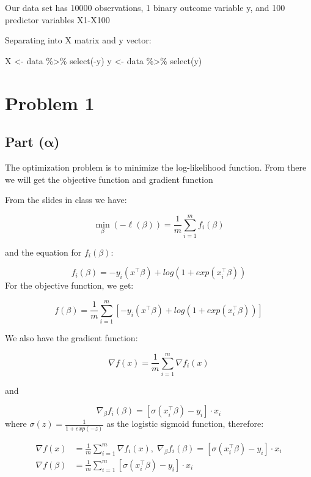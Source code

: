 \documentclass[
  letterpaper,
  DIV=11,
  numbers=noendperiod]{scrartcl}
\newenvironment{Shaded}{\begin{snugshade}}{\end{snugshade}}
\newcommand{\FunctionTok}[1]{\textcolor[rgb]{0.28,0.35,0.67}{#1}}
\newcommand{\NormalTok}[1]{\textcolor[rgb]{0.00,0.23,0.31}{#1}}
\newcommand{\OtherTok}[1]{\textcolor[rgb]{0.00,0.23,0.31}{#1}}
\newcommand{\SpecialCharTok}[1]{\textcolor[rgb]{0.37,0.37,0.37}{#1}}
\begin{document}
Our data set has 10000 observations, 1 binary outcome variable y, and
100 predictor variables X1-X100

Separating into X matrix and y vector:

\begin{Shaded}
\begin{Highlighting}[]
\NormalTok{X }\OtherTok{\textless{}{-}}\NormalTok{ data }\SpecialCharTok{\%\textgreater{}\%}
  \FunctionTok{select}\NormalTok{(}\SpecialCharTok{{-}}\NormalTok{y)}
\NormalTok{y }\OtherTok{\textless{}{-}}\NormalTok{ data }\SpecialCharTok{\%\textgreater{}\%}
  \FunctionTok{select}\NormalTok{(y)}
\end{Highlighting}
\end{Shaded}

\section{Problem 1}\label{problem-1}

\subsection{\texorpdfstring{Part
(\(\symbf{\alpha}\))}{Part (\textbackslash symbf\{\textbackslash alpha\})}}\label{part-symbfalpha}

The optimization problem is to minimize the log-likelihood function.
From there we will get the objective function and gradient function

From the slides in class we have:

\[
\min_{\beta} (-\ell(\beta)) = \frac{1}{m} \sum_{i=1}^{m} f_i(\beta)
\]

and the equation for \(f_i(\beta)\):

\[
f_i(\beta) = -y_i(x^\intercal\beta) + log(1 + exp(x_i^\intercal \beta))
\] For the objective function, we get:

\[
\boxed{f(\beta) = \frac{1}{m} \sum_{i=1}^{m} [-y_i(x^\intercal\beta) + log(1 + exp(x_i^\intercal \beta))]}
\]

We also have the gradient function:

\[
\nabla f(x) = \frac{1}{m} \sum_{i=1}^m \nabla f_i(x)
\]

and

\[
\nabla_\beta f_i(\beta) = [\sigma(x_i^\intercal \beta) - y_i] \cdot x_i
\] where \(\sigma(z) = \frac{1}{1+exp(-z)}\) as the logistic sigmoid
function, therefore:

\[
\begin{aligned}
\nabla f(x) &= \frac{1}{m} \sum_{i=1}^m \nabla f_i(x), \; \nabla_\beta f_i(\beta) = [\sigma(x_i^\intercal \beta) - y_i] \cdot x_i \\
\nabla f(\beta) &= \boxed{{\frac{1}{m} \sum_{i=1}^m [\sigma(x_i^\intercal \beta) - y_i] \cdot x_i}}
\end{aligned}
\]
\end{document}
